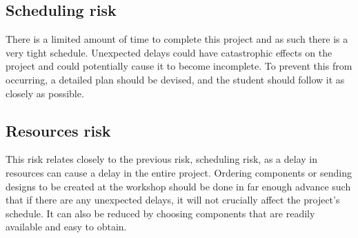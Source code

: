         \subsection{Scheduling risk}
            There is a limited amount of time to complete this project and as such there is a very tight schedule. Unexpected delays could have catastrophic effects on the project and could potentially cause it to become incomplete. To prevent this from occurring, a detailed plan should be devised, and the student should follow it as closely as possible.  
        \subsection{Resources risk}
            This risk relates closely to the previous risk, scheduling risk, as a delay in resources can cause a delay in the entire project. Ordering components or sending designs to be created at the workshop should be done in far enough advance such that if there are any unexpected delays, it will not crucially affect the project's schedule. It can also be reduced by choosing components that are readily available and easy to obtain.\\

